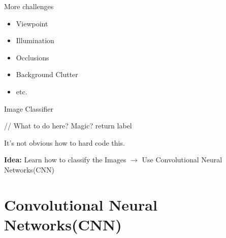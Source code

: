 \documentclass[citestyle=authoryear,bibstyle=numeric,hyperref,backend=biber]{sdqbeamer}
\begin{document}
\begin{frame}{More challenges}
    \begin{itemize}
        \item Viewpoint
        \item Illumination
        \item Occlusions
        \item Background Clutter
        \item etc.
    \end{itemize}
\end{frame}

\begin{frame}{Image Classifier}
    \begin{cyanblock}{}
    \begin{algorithmic}
            \State // What to do here? Magic?
            \State return label
        \EndFunction
    \end{algorithmic}
    \end{cyanblock}

    \vspace{0.3cm}
    It's not obvious how to hard code this.

    \pause
    
    \vspace{0.3cm}
    \textbf{Idea:} Learn how to classify the Images $\longrightarrow$ Use Convolutional Neural Networks(CNN)
\end{frame}

\section{Convolutional Neural Networks(CNN)}
\end{document}
